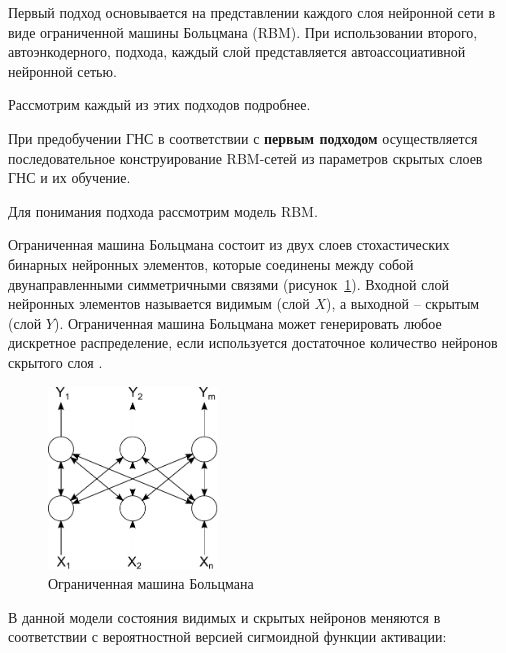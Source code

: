 Первый подход основывается на представлении каждого слоя нейронной сети в виде ограниченной машины Больцмана (RBM). При использовании второго, автоэнкодерного, подхода, каждый слой  представляется автоассоциативной нейронной сетью.

Рассмотрим каждый из этих подходов подробнее.

\def\slantfrac#1#2{ \hspace{3pt}\!^{#1}\!\!\hspace{1pt}/
  \hspace{2pt}\!\!_{#2}\!\hspace{3pt}
}

При предобучении ГНС в соответствии с \textbf{первым подходом} осуществляется последовательное конструирование RBM-сетей из параметров скрытых слоев ГНС и их обучение. 

Для понимания подхода рассмотрим модель RBM.

Ограниченная машина Больцмана состоит из двух слоев стохастических бинарных нейронных элементов, которые соединены между собой двунаправленными симметричными связями (рисунок~\ref{fig:pic1_3}). Входной слой нейронных элементов называется видимым (слой $X$), а выходной -- скрытым (слой $Y$). Ограниченная машина Больцмана может генерировать любое дискретное распределение, если используется достаточное количество нейронов скрытого слоя \cite{n5}.

\begin{figure}[H]
  \centering
  \includegraphics[width=0.4\textwidth]{man-source/images/ch1/pic1-3.pdf}
  \caption{Ограниченная машина Больцмана}
  \label{fig:pic1_3}
\end{figure}	

В данной модели состояния видимых и скрытых нейронов меняются в соответствии с вероятностной версией сигмоидной функции активации:
	
